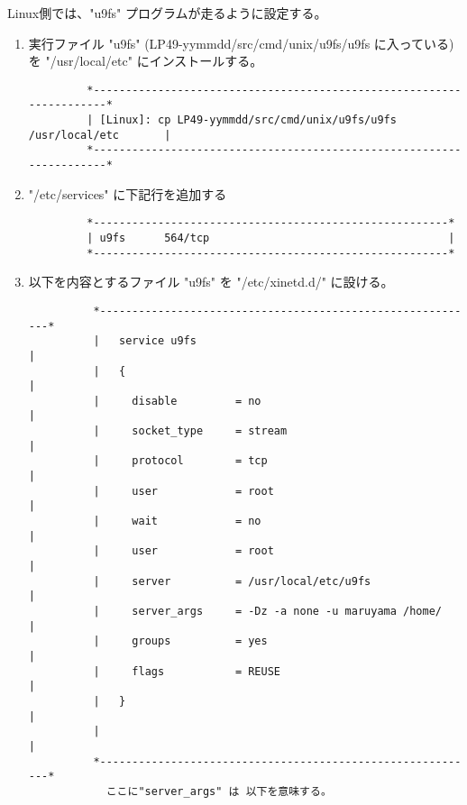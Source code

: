         Linux側では、"u9fs" プログラムが走るように設定する。
\begin{enumerate}
\item      実行ファイル "u9fs"  (LP49-yymmdd/src/cmd/unix/u9fs/u9fs に入っている) を
            "/usr/local/etc" にインストールする。\\
\begin{verbatim}    
         *---------------------------------------------------------------------* 
         | [Linux]: cp LP49-yymmdd/src/cmd/unix/u9fs/u9fs /usr/local/etc       |
         *---------------------------------------------------------------------*
\end{verbatim}    

\item    "/etc/services" に下記行を追加する\\
\begin{verbatim}    
         *-------------------------------------------------------*    
         | u9fs      564/tcp                                     | 
         *-------------------------------------------------------*
\end{verbatim}    

\item 以下を内容とするファイル "u9fs" を "/etc/xinetd.d/" に設ける。\\

\begin{verbatim}    
          *-----------------------------------------------------------*                      
          |   service u9fs                                            |
          |   {                                                       |
          |     disable         = no                                  |
          |     socket_type     = stream                              |
          |     protocol        = tcp                                 |
          |     user            = root                                |
          |     wait            = no                                  |
          |     user            = root                                |
          |     server          = /usr/local/etc/u9fs                 |
          |     server_args     = -Dz -a none -u maruyama /home/      |
          |     groups          = yes                                 |
          |     flags           = REUSE                               |
          |   }                                                       |
          |                                                           |
          *-----------------------------------------------------------*
            ここに"server_args" は 以下を意味する。                  
                                                                     

\end{verbatim}
\end{enumerate}
